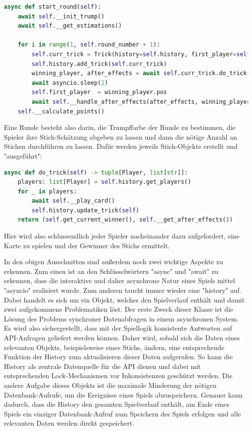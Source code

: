\begin{lstlisting}[language=Python]
async def start_round(self):
	await self.__init_trump()
	await self.__get_estimations()
	
	for i in range(1, self.round_number + 1):
		self.curr_trick = Trick(history=self.history, first_player=self.first_player, trick_number=i, trump_color=self.trump_color)
		self.history.add_trick(self.curr_trick)
		winning_player, after_effects = await self.curr_trick.do_trick()
		await asyncio.sleep(2)
		self.first_player  = winning_player.pos
		await self.__handle_after_effects(after_effects, winning_player, i)
	self.__calculate_points()
\end{lstlisting}

Eine Runde besteht also darin, die Trumpffarbe der Runde zu bestimmen, die Spieler ihre Stich-Schätzung abgeben zu lassen und dann die nötige Anzahl an Stichen durchführen zu lassen. Dafür werden jeweils Stich-Objekte erstellt und "ausgeführt":

\begin{lstlisting}[language=Python]
async def do_trick(self) -> tuple[Player, list[str]]:
	players: list[Player] = self.history.get_players()
	for _ in players:
		await self.__play_card()
		self.history.update_trick(self)
	return (self.get_current_winner(), self.__get_after_effects())
\end{lstlisting}

Hier wird also schlussendlich jeder Spieler nacheinander dazu aufgefordert, eine Karte zu spielen und der Gewinner des Stichs ermittelt.

In den obigen Ausschnitten sind außerdem noch zwei wichtige Aspekte zu erkennen. Zum einen ist an den Schlüsselwörtern "async" und "await" zu erkennen, dass die interaktive und daher asynchrone Natur eines Spiels mittel "asyncio" realisiert wurde. Zum anderen taucht immer wieder eine "history" auf. Dabei handelt es sich um ein Objekt, welches den Spielverlauf enthält und damit zwei aufgekommene Problematiken löst. Der erste Zweck dieser Klasse ist die Lösung des Problems synchroner Datenabfragen in einem asynchronen System. Es wird also sichergestellt, dass mit der Spiellogik konsistente Antworten auf API-Anfragen geliefert werden können. Daher wird, sobald sich die Daten eines relevanten Objekts, beispielsweise eines Stichs, ändern, eine entsprechende Funktion der History zum aktualisieren dieser Daten aufgerufen. So kann die History als zentrale Datenquelle für die API dienen und dabei mit entsprechenden Lock-Mechanismen vor Inkonsistenzen geschützt werden. Die andere Aufgabe dieses Objekts ist die maximale Minderung der nötigen Datenbank-Aufrufe, um die Ereignisse eines Spiels abzuspeichern. Genauer kann dadurch, dass die History den gesamten Spielverlauf enthält, am Ende eines Spiels ein einziger Datenbank-Aufruf zum Speichern des Spiels erfolgen und alle relevanten Daten werden direkt gespeichert.

